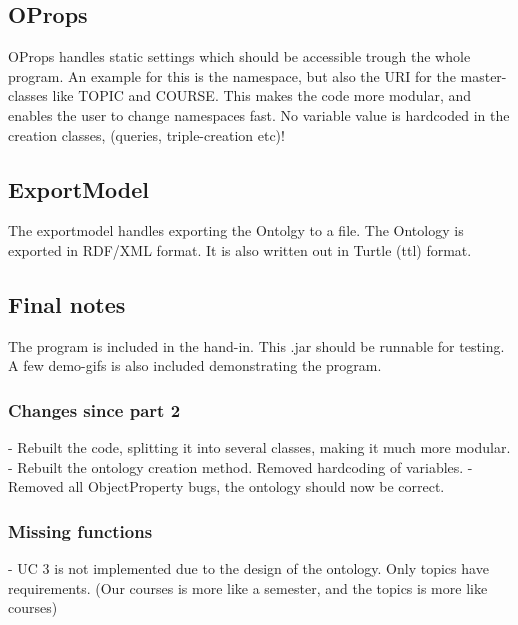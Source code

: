 \documentclass{article}
\begin{document}
\newpage

\subsection {OProps}
OProps handles static settings which should be accessible trough the whole program. An example for this is the namespace, but also
the URI for the master-classes like TOPIC and COURSE. This makes the code more modular, and enables the user to change namespaces fast.
No variable value is hardcoded in the creation classes, (queries, triple-creation etc)!

\subsection {ExportModel}
The exportmodel handles exporting the Ontolgy to a file. The Ontology is exported in RDF/XML format. It is also written out in Turtle (ttl) format.

\subsection {Final notes}
The program is included in the hand-in. This .jar should be runnable for testing. A few demo-gifs is also included demonstrating the program.

\subsubsection {Changes since part 2}
- Rebuilt the code, splitting it into several classes, making it much more modular.
\newline- Rebuilt the ontology creation method. Removed hardcoding of variables.
\newline- Removed all ObjectProperty bugs, the ontology should now be correct.

\subsubsection {Missing functions}
- UC 3 is not implemented due to the design of the ontology. Only topics have requirements. (Our courses is more like a semester, and the topics is more like courses)





\vspace*{8px}
\end{document}
